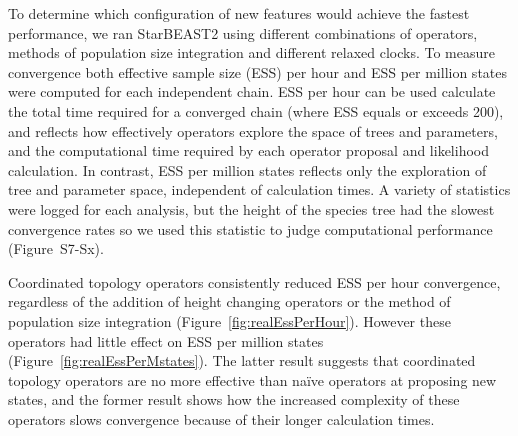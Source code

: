 \documentclass[12pt]{article}
\begin{document}
To determine which configuration of new features would achieve the fastest
performance, we ran StarBEAST2 using different combinations of operators,
methods of population size integration and different relaxed clocks. To measure
convergence both effective sample size (ESS) per hour and ESS per million states
were computed for each independent chain. ESS per hour can be used calculate the
total time required for a converged chain (where ESS equals or exceeds 200),
and reflects how effectively operators explore the space of trees and parameters, and the computational time
required by each operator proposal and likelihood calculation. In contrast, ESS per
million states reflects only the exploration of tree and parameter space,
independent of calculation times. A variety of statistics were logged for each
analysis, but the height of the species tree had the slowest convergence rates
so we used this statistic to judge computational performance (Figure~S7-Sx).

Coordinated topology operators consistently reduced ESS per hour convergence,
regardless of the addition of height changing operators or the method of
population size integration (Figure~\ref{fig:realEssPerHour}). However these
operators had little effect on ESS per million states (Figure~\ref{fig:realEssPerMstates}).
The latter result suggests that coordinated topology operators are no more
effective than na\"ive operators at proposing new states, and the former result
shows how the increased complexity of these operators slows convergence because
of their longer calculation times.
\end{document}
